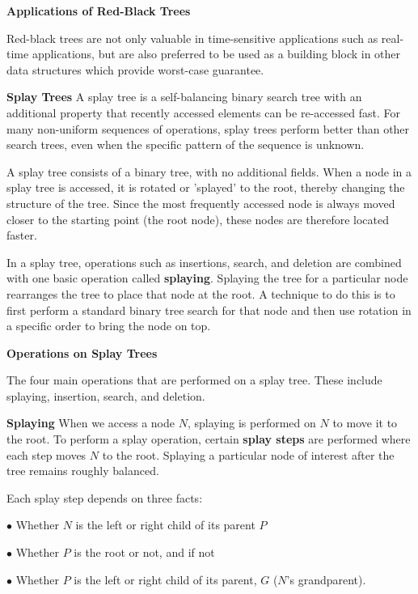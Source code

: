 \filbreak
\vskip 3mm
{\bf Applications of Red-Black Trees}

\vskip 1mm
Red-black trees are not only valuable in time-sensitive applications such as real-time applications, but are also preferred to be used as a building block in other data structures which provide worst-case guarantee.

\filbreak
\vskip 1cm
{\bf Splay Trees}
\vskip 3mm
A splay tree is a self-balancing binary search tree with an additional property that recently accessed elements can be re-accessed fast. For many non-uniform sequences of operations, splay trees perform better than other search trees, even when the specific pattern of the sequence is unknown.

\vskip 1mm
A splay tree consists of a binary tree, with no additional fields. When a node in a splay tree is accessed, it is rotated or 'splayed' to the root, thereby changing the structure of the tree. Since the most frequently accessed node is always moved closer to the starting point (the root node), these nodes are therefore located faster.

\vskip 1mm In a splay tree, operations such as insertions, search, and deletion are combined with one basic operation called {\bf splaying}. Splaying the tree for a particular node rearranges the tree to place that node at the root. A technique to do this is to first perform a standard binary tree search for that node and then use rotation in a specific order to bring the node on top.

\filbreak
\vskip 3mm
{\bf Operations on Splay Trees}

\vskip 1mm
The four main operations that are performed on a splay tree. These include splaying, insertion, search, and deletion.

\vskip 2mm
{\bf Splaying}
\vskip 1mm
When we access a node $N$, splaying is performed on $N$ to move it to the root. To perform a splay operation, certain {\bf splay steps} are performed where each step moves $N$ to the root. Splaying a particular node of interest after the tree remains roughly balanced.

\vskip 1mm
Each splay step depends on three facts:

\vskip 1mm
\qquad$\bullet$ Whether $N$ is the left or right child of its parent $P$

\vskip 3mm
\qquad$\bullet$ Whether $P$ is the root or not, and if not

\vskip 3mm
\qquad$\bullet$ Whether $P$ is the left or right child of its parent, $G$ ($N$'s grandparent).

